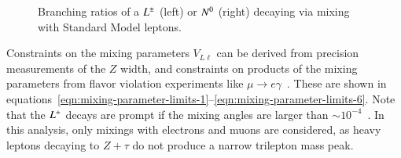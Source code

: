 \begin{figure}[h]
  \centering
  \hfill
  \caption{Branching ratios of a $L^{\pm}$ (left) or $N^{0}$ (right) decaying via mixing with Standard Model leptons.}
  \label{fig:resonance-branching-ratios}
\end{figure}

Constraints on the mixing parameters $V_{L\ell}$ can be derived from precision measurements of the $Z$ width, and constraints on products of the mixing parameters from flavor violation experiments like $\mu\rightarrow e\gamma$~\cite{Abada:2008hr,Abada:2007kn,delAguila:2008cv,Altmannshofer:2014ej}. These are shown in equations~\ref{eqn:mixing-parameter-limits-1}--\ref{eqn:mixing-parameter-limits-6}. Note that the $L^{\pm}$ decays are prompt if the mixing angles are larger than $\sim10^{-4}$~\cite{arkanihamednaturalness}. In this analysis, only mixings with electrons and muons are considered, as heavy leptons decaying to $Z+\tau$ do not produce a narrow trilepton mass peak.

